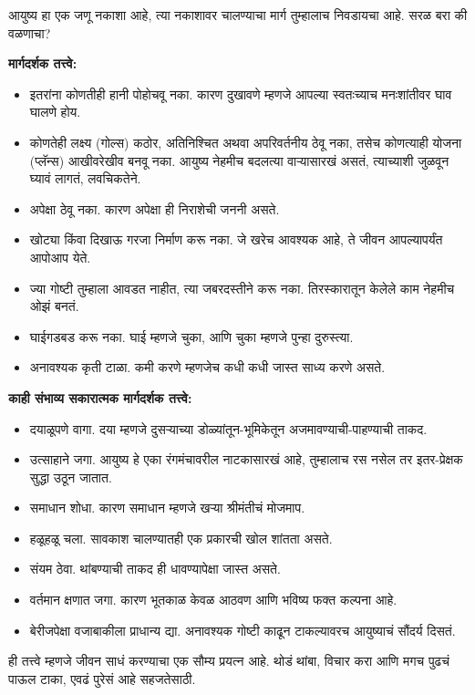 आयुष्य हा एक जणू नकाशा आहे, त्या नकाशावर चालण्याचा मार्ग तुम्हालाच निवडायचा आहे. सरळ बरा की वळणाचा?

\textbf{मार्गदर्शक तत्त्वे:}
\begin{itemize}
\item इतरांना कोणतीही हानी पोहोचवू नका. कारण दुखावणे म्हणजे आपल्या स्वतःच्याच मनःशांतीवर घाव घालणे होय.
\item कोणतेही लक्ष्य (गोल्स) कठोर, अतिनिश्चित अथवा अपरिवर्तनीय ठेवू नका, तसेच कोणत्याही योजना (प्लॅन्स)  आखीवरेखीव बनवू  नका. आयुष्य नेहमीच बदलत्या वाऱ्यासारखं असतं, त्याच्याशी जुळवून घ्यावं लागतं, लवचिकतेने.
\item अपेक्षा ठेवू नका. कारण अपेक्षा ही निराशेची जननी असते.
\item खोट्या किंवा दिखाऊ गरजा निर्माण करू नका. जे खरेच आवश्यक आहे, ते जीवन आपल्यापर्यंत आपोआप येते.
\item ज्या गोष्टी तुम्हाला आवडत नाहीत, त्या जबरदस्तीने करू नका. तिरस्कारातून केलेले काम नेहमीच ओझं बनतं.
\item घाईगडबड करू नका. घाई म्हणजे चुका, आणि चुका म्हणजे पुन्हा दुरुस्त्या.
\item अनावश्यक कृती टाळा. कमी करणे म्हणजेच कधी कधी जास्त साध्य करणे असते.
\end{itemize}


\textbf{काही संभाव्य सकारात्मक मार्गदर्शक तत्त्वे:}
\begin{itemize}
\item दयाळूपणे वागा. दया म्हणजे दुसऱ्याच्या डोळ्यांतून-भूमिकेतून अजमावण्याची-पाहण्याची ताकद.
\item उत्साहाने जगा. आयुष्य हे एका रंगमंचावरील नाटकासारखं आहे, तुम्हालाच रस नसेल तर इतर-प्रेक्षक सुद्धा उठून जातात.
\item समाधान शोधा. कारण समाधान म्हणजे खऱ्या श्रीमंतीचं मोजमाप.
\item हळूहळू चला. सावकाश चालण्यातही एक प्रकारची खोल शांतता असते.
\item संयम ठेवा. थांबण्याची ताकद ही धावण्यापेक्षा जास्त असते.
\item वर्तमान क्षणात जगा. कारण भूतकाळ केवळ आठवण आणि भविष्य फक्त कल्पना आहे.
\item बेरीजपेक्षा वजाबाकीला प्राधान्य द्या. अनावश्यक गोष्टी काढून टाकल्यावरच आयुष्याचं सौंदर्य दिसतं.
\end{itemize}

ही तत्त्वे म्हणजे जीवन साधं करण्याचा एक सौम्य प्रयत्न आहे. थोडं थांबा, विचार करा आणि मगच पुढचं पाऊल टाका, एवढं पुरेसं आहे सहजतेसाठी.





